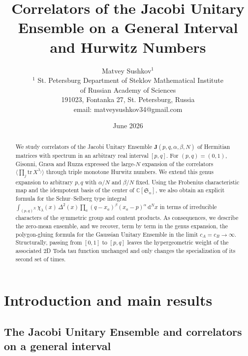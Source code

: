 \documentclass{article}
\title{Correlators of the Jacobi Unitary Ensemble on a General Interval and Hurwitz Numbers}
\author{Matvey Sushkov$^{1}$\\
{\small$^{1}$ 
  St. Petersburg Department
    of Steklov Mathematical Institute}\\
  {\small of Russian Academy of Sciences}\\
  {\small 191023, Fontanka 27, St. Petersburg, Russia}\\
{\small email: matveysushkov34@gmail.com}}
\date{June 2026}
\theoremstyle{plain}
\theoremstyle{definition}
\numberwithin{equation}{section}
\begin{document}
\maketitle

\begin{abstract}
    We study correlators of the Jacobi Unitary Ensemble $\mathbf J(p,q,\alpha,\beta,N)$
    of Hermitian matrices with spectrum in an arbitrary real interval $[p,q]$.
    For $(p,q)=(0,1)$, Gisonni, Grava and Ruzza expressed the large-$N$
    expansion of the correlators $\langle\prod_j \mathrm{tr}\,X^{\lambda_j}\rangle$
    through triple monotone Hurwitz numbers. We extend this genus expansion to
    arbitrary $p,q$ with $\alpha/N$ and $\beta/N$ fixed. Using the Frobenius characteristic
    map and the idempotent basis of the center of $\mathbb C[\mathfrak S_n]$,
    we also obtain an explicit formula for the Schur--Selberg type integral
    $\int_{(p,q)^N}\chi_\lambda(x)\,\Delta^2(x)\prod_a (q-x_a)^\beta (x_a-p)^\alpha\,\mathrm{d}^Nx$
    in terms of irreducible characters of the symmetric group and content products. As consequences, we describe the zero-mean ensemble, and we recover, term by term in the genus expansion, the polygon-gluing
    formula for the Gaussian Unitary Ensemble in the limit $c_A=c_B\to\infty$.
    Structurally, passing from $[0,1]$ to $[p,q]$ leaves the hypergeometric weight of the
    associated 2D Toda tau function unchanged and only changes the specialization of its second set of times.
\end{abstract}

\section{Introduction and main results}
\label{sec:intro}

\subsection{The Jacobi Unitary Ensemble and correlators on a general interval}
\end{document}
